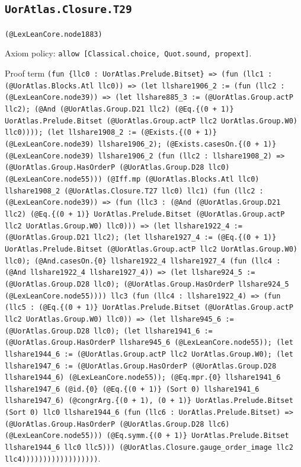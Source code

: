 \documentclass[11pt]{article}
\begin{document}
\subsection*{\texttt{UorAtlas.Closure.T29}}
\noindent\texttt{(@LexLeanCore.node1883)}\par
\noindent Axiom policy: \texttt{allow [Classical.choice, Quot.sound, propext]}.\par
\noindent Proof term \texttt{(fun \{llc0 : UorAtlas.Prelude.Bitset\} => (fun (llc1 : (@UorAtlas.Blocks.Atl llc0)) => (let llshare1906\_2 := (fun (llc2 : (@LexLeanCore.node39)) => (let llshare885\_3 := (@UorAtlas.Group.actP llc2); (@And (@UorAtlas.Group.D21 llc2) (@Eq.\{(0 + 1)\} UorAtlas.Prelude.Bitset (@UorAtlas.Group.actP llc2 UorAtlas.Group.W0) llc0)))); (let llshare1908\_2 := (@Exists.\{(0 + 1)\} (@LexLeanCore.node39) llshare1906\_2); (@Exists.casesOn.\{(0 + 1)\} (@LexLeanCore.node39) llshare1906\_2 (fun (llc2 : llshare1908\_2) => (@UorAtlas.Group.HasOrderP (@UorAtlas.Group.D28 llc0) (@LexLeanCore.node55))) (@Iff.mp (@UorAtlas.Blocks.Atl llc0) llshare1908\_2 (@UorAtlas.Closure.T27 llc0) llc1) (fun (llc2 : (@LexLeanCore.node39)) => (fun (llc3 : (@And (@UorAtlas.Group.D21 llc2) (@Eq.\{(0 + 1)\} UorAtlas.Prelude.Bitset (@UorAtlas.Group.actP llc2 UorAtlas.Group.W0) llc0))) => (let llshare1922\_4 := (@UorAtlas.Group.D21 llc2); (let llshare1927\_4 := (@Eq.\{(0 + 1)\} UorAtlas.Prelude.Bitset (@UorAtlas.Group.actP llc2 UorAtlas.Group.W0) llc0); (@And.casesOn.\{0\} llshare1922\_4 llshare1927\_4 (fun (llc4 : (@And llshare1922\_4 llshare1927\_4)) => (let llshare924\_5 := (@UorAtlas.Group.D28 llc0); (@UorAtlas.Group.HasOrderP llshare924\_5 (@LexLeanCore.node55)))) llc3 (fun (llc4 : llshare1922\_4) => (fun (llc5 : (@Eq.\{(0 + 1)\} UorAtlas.Prelude.Bitset (@UorAtlas.Group.actP llc2 UorAtlas.Group.W0) llc0)) => (let llshare945\_6 := (@UorAtlas.Group.D28 llc0); (let llshare1941\_6 := (@UorAtlas.Group.HasOrderP llshare945\_6 (@LexLeanCore.node55)); (let llshare1944\_6 := (@UorAtlas.Group.actP llc2 UorAtlas.Group.W0); (let llshare1947\_6 := (@UorAtlas.Group.HasOrderP (@UorAtlas.Group.D28 llshare1944\_6) (@LexLeanCore.node55)); (@Eq.mpr.\{0\} llshare1941\_6 llshare1947\_6 (@id.\{0\} (@Eq.\{(0 + 1)\} (Sort 0) llshare1941\_6 llshare1947\_6) (@congrArg.\{(0 + 1), (0 + 1)\} UorAtlas.Prelude.Bitset (Sort 0) llc0 llshare1944\_6 (fun (llc6 : UorAtlas.Prelude.Bitset) => (@UorAtlas.Group.HasOrderP (@UorAtlas.Group.D28 llc6) (@LexLeanCore.node55))) (@Eq.symm.\{(0 + 1)\} UorAtlas.Prelude.Bitset llshare1944\_6 llc0 llc5))) (@UorAtlas.Closure.gauge\_order\_image llc2 llc4))))))))))))))))))}.\par
\end{document}
